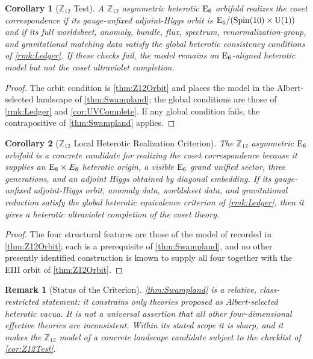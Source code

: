 \documentclass[pdflatex,sn-mathphys-num]{sn-jnl}
\theoremstyle{thmstyleone}
\newtheorem{corollary}[corollary]{Corollary}
\theoremstyle{thmstylethree}%
\theoremstyle{thmstyletwo}%
\newtheorem{remark}[remark]{Remark}
\begin{document}
\begin{corollary}[$\mathbb Z_{12}$ Test]
\label{cor:Z12Test}
A $\mathbb Z_{12}$ asymmetric heterotic $\mathrm{E}_{6}$ orbifold realizes the coset
correspondence if its gauge-unfixed adjoint-Higgs orbit is $\mathrm{E}_{6}/(\operatorname{Spin}(10) \times \mathrm{U(1)})$ and
if its full worldsheet, anomaly, bundle, flux, spectrum, renormalization-group,
and gravitational matching data satisfy the global heterotic consistency
conditions of \autoref{rmk:Ledger}.  If these checks fail, the model remains an
$\mathrm{E}_{6}$-aligned heterotic model but not the coset ultraviolet completion.
\end{corollary}

\begin{proof}
The orbit condition is \autoref{thm:Z12Orbit} and places the model in the
Albert-selected landscape of \autoref{thm:Swampland}; the global conditions are
those of \autoref{rmk:Ledger} and \autoref{cor:UVComplete}.  If any global
condition fails, the contrapositive of \autoref{thm:Swampland} applies.
\end{proof}

\begin{corollary}[$\mathbb Z_{12}$ Local Heterotic Realization Criterion]
\label{cor:Z12Leading}
The $\mathbb Z_{12}$ asymmetric $\mathrm{E}_{6}$ orbifold is a concrete candidate for
realizing the coset correspondence because it supplies an $\mathrm{E}_{8}\times E_{8}$
heterotic origin, a visible $\mathrm{E}_{6}$ grand unified sector, three generations,
and an adjoint Higgs obtained by diagonal embedding. If its gauge-unfixed
adjoint-Higgs orbit, anomaly data, worldsheet data, and gravitational reduction
satisfy the global heterotic equivalence criterion of \autoref{rmk:Ledger},
then it gives a heterotic ultraviolet completion of the coset theory.
\end{corollary}

\begin{proof}
The four structural features are those of the model of
\cite{Z12Heterotic} recorded in \autoref{thm:Z12Orbit}; each is a prerequisite of
\autoref{thm:Swampland}, and no other presently identified construction is known
to supply all four together with the EIII orbit of \autoref{thm:Z12Orbit}.
\end{proof}

\begin{remark}[Status of the Criterion]
\label{rmk:SwamplandStatus}
\autoref{thm:Swampland} is a relative, class-restricted statement: it constrains
only theories proposed as Albert-selected heterotic vacua. It is
not a universal assertion that all other four-dimensional effective theories are
inconsistent. Within its stated scope it is sharp, and it makes the
$\mathbb Z_{12}$ model of \cite{Z12Heterotic} a concrete landscape candidate
subject to the checklist of \autoref{cor:Z12Test}.
\end{remark}
\end{document}
